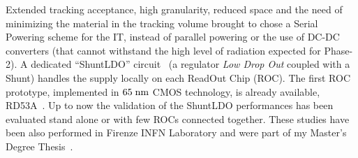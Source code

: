 \documentclass[a4paper,11pt,english]{article}
\begin{document}
\begin{description}[style=unboxed,leftmargin=.2cm]
\item[Studies of Serial Powering for Phase-2 Inner Tracker upgrade.] Extended tracking acceptance, high granularity, reduced space and the need of minimizing the material in the tracking volume brought to chose a Serial Powering scheme for the IT, instead of parallel powering or the use of DC-DC converters (that cannot withstand the high level of radiation expected for Phase-2).
A dedicated ``ShuntLDO'' circuit~\cite{SLDO} (a regulator \textit{Low Drop Out} coupled with a Shunt) handles the supply locally on each ReadOut Chip (ROC). The first ROC prototype, implemented in $65\rm \; nm$ CMOS technology, is already available, RD53A~\cite{RD53A}. 
Up to now the validation of the ShuntLDO performances has been evaluated stand alone or with few ROCs connected together. 
These studies have been also performed in Firenze INFN Laboratory and were part of my Master's Degree Thesis~\cite{tesi}.
\begin{siderules}
\end{siderules}
\end{description}
\end{document}
